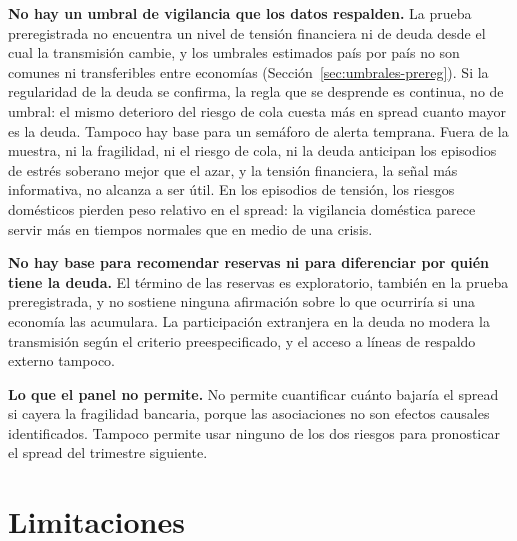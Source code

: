 \textbf{No hay un umbral de vigilancia que los datos respalden.} La prueba preregistrada no encuentra un nivel de tensión financiera ni de deuda desde el cual la transmisión cambie, y los umbrales estimados país por país no son comunes ni transferibles entre economías (Sección~\ref{sec:umbrales-prereg}). Si la regularidad de la deuda se confirma, la regla que se desprende es continua, no de umbral: el mismo deterioro del riesgo de cola cuesta más en spread cuanto mayor es la deuda. Tampoco hay base para un semáforo de alerta temprana. Fuera de la muestra, ni la fragilidad, ni el riesgo de cola, ni la deuda anticipan los episodios de estrés soberano mejor que el azar, y la tensión financiera, la señal más informativa, no alcanza a ser útil. En los episodios de tensión, los riesgos domésticos pierden peso relativo en el spread: la vigilancia doméstica parece servir más en tiempos normales que en medio de una crisis.

\textbf{No hay base para recomendar reservas ni para diferenciar por quién tiene la deuda.} El término de las reservas es exploratorio, también en la prueba preregistrada, y no sostiene ninguna afirmación sobre lo que ocurriría si una economía las acumulara. La participación extranjera en la deuda no modera la transmisión según el criterio preespecificado, y el acceso a líneas de respaldo externo tampoco.

\textbf{Lo que el panel no permite.} No permite cuantificar cuánto bajaría el spread si cayera la fragilidad bancaria, porque las asociaciones no son efectos causales identificados. Tampoco permite usar ninguno de los dos riesgos para pronosticar el spread del trimestre siguiente.

\section{Limitaciones}

